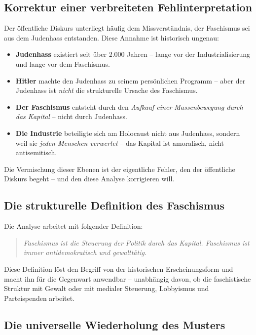 \subsection{Korrektur einer verbreiteten Fehlinterpretation}

Der öffentliche Diskurs unterliegt häufig dem Missverständnis, der Faschismus sei aus dem Judenhass entstanden. Diese Annahme ist historisch ungenau:

\begin{itemize}
    \item \textbf{Judenhass} existiert seit über 2.000 Jahren -- lange vor der Industrialisierung und lange vor dem Faschismus.
    \item \textbf{Hitler} machte den Judenhass zu seinem persönlichen Programm -- aber der Judenhass ist \emph{nicht} die strukturelle Ursache des Faschismus.
    \item \textbf{Der Faschismus} entsteht durch den \emph{Aufkauf einer Massenbewegung durch das Kapital} -- nicht durch Judenhass.
    \item \textbf{Die Industrie} beteiligte sich am Holocaust nicht aus Judenhass, sondern weil sie \emph{jeden Menschen verwertet} -- das Kapital ist amoralisch, nicht antisemitisch.
\end{itemize}

Die Vermischung dieser Ebenen ist der eigentliche Fehler, den der öffentliche Diskurs begeht -- und den diese Analyse korrigieren will.

\subsection{Die strukturelle Definition des Faschismus}

Die Analyse arbeitet mit folgender Definition:

\begin{quote}
\emph{Faschismus ist die Steuerung der Politik durch das Kapital. Faschismus ist immer antidemokratisch und gewalttätig.}
\end{quote}

Diese Definition löst den Begriff von der historischen Erscheinungsform und macht ihn für die Gegenwart anwendbar -- unabhängig davon, ob die faschistische Struktur mit Gewalt oder mit medialer Steuerung, Lobbyismus und Parteispenden arbeitet.

\subsection{Die universelle Wiederholung des Musters}

